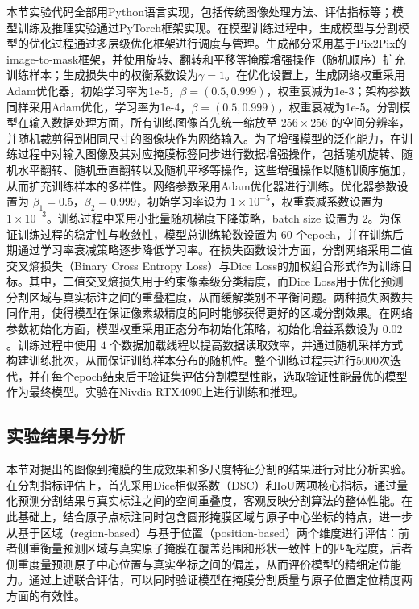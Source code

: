 本节实验代码全部用Python语言实现，包括传统图像处理方法、评估指标等；模型训练及推理实验通过PyTorch框架实现。在模型训练过程中，生成模型与分割模型的优化过程通过多层级优化框架进行调度与管理。生成部分采用基于Pix2Pix的image-to-mask框架，并使用旋转、翻转和平移等掩膜增强操作（随机顺序）扩充训练样本；生成损失中的权衡系数设为$\gamma=1$。在优化设置上，生成网络权重采用Adam优化器，初始学习率为1e-5，$\beta=(0.5,0.999)$，权重衰减为1e-3；架构参数同样采用Adam优化，学习率为1e-4，$\beta=(0.5,0.999)$，权重衰减为1e-5。分割模型在输入数据处理方面，所有训练图像首先统一缩放至 $256\times256$ 的空间分辨率，并随机裁剪得到相同尺寸的图像块作为网络输入。为了增强模型的泛化能力，在训练过程中对输入图像及其对应掩膜标签同步进行数据增强操作，包括随机旋转、随机水平翻转、随机垂直翻转以及随机平移等操作，这些增强操作以随机顺序施加，从而扩充训练样本的多样性。网络参数采用Adam优化器进行训练。优化器参数设置为 $\beta_1=0.5$，$\beta_2=0.999$，初始学习率设为 $1\times10^{-5}$，权重衰减系数设置为 $1\times10^{-3}$。训练过程中采用小批量随机梯度下降策略，batch size 设置为 $2$。为保证训练过程的稳定性与收敛性，模型总训练轮数设置为 $60$ 个epoch，并在训练后期通过学习率衰减策略逐步降低学习率。在损失函数设计方面，分割网络采用二值交叉熵损失（Binary Cross Entropy Loss）与Dice Loss的加权组合形式作为训练目标。其中，二值交叉熵损失用于约束像素级分类精度，而Dice Loss用于优化预测分割区域与真实标注之间的重叠程度，从而缓解类别不平衡问题。两种损失函数共同作用，使得模型在保证像素级精度的同时能够获得更好的区域分割效果。在网络参数初始化方面，模型权重采用正态分布初始化策略，初始化增益系数设为 $0.02$。训练过程中使用 $4$ 个数据加载线程以提高数据读取效率，并通过随机采样方式构建训练批次，从而保证训练样本分布的随机性。整个训练过程共进行5000次迭代，并在每个epoch结束后于验证集评估分割模型性能，选取验证性能最优的模型作为最终模型。实验在Nivdia RTX4090上进行训练和推理。

\subsection{实验结果与分析}
本节对提出的图像到掩膜的生成效果和多尺度特征分割的结果进行对比分析实验。在分割指标评估上，首先采用Dice相似系数（DSC）和IoU两项核心指标，通过量化预测分割结果与真实标注之间的空间重叠度，客观反映分割算法的整体性能。在此基础上，结合原子点标注同时包含圆形掩膜区域与原子中心坐标的特点，进一步从基于区域（region-based）与基于位置（position-based）两个维度进行评估：前者侧重衡量预测区域与真实原子掩膜在覆盖范围和形状一致性上的匹配程度，后者侧重度量预测原子中心位置与真实坐标之间的偏差，从而评价模型的精细定位能力。通过上述联合评估，可以同时验证模型在掩膜分割质量与原子位置定位精度两方面的有效性。

